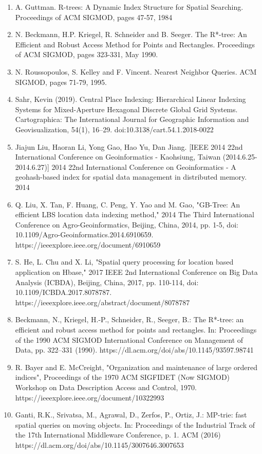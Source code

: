 %




\begin{enumerate}[1)]
    \item A. Guttman. R-trees: A Dynamic Index Structure for Spatial Searching. Proceedings of ACM SIGMOD, pages 47-57, 1984
    \item N. Beckmann, H.P. Kriegel, R. Schneider and B. Seeger. The R*-tree: An Efficient and Robust Access Method for Points and Rectangles. Proceedings of ACM SIGMOD, pages 323-331, May 1990.
    \item N. Roussopoulos, S. Kelley and F. Vincent. Nearest Neighbor Queries. ACM SIGMOD, pages 71-79, 1995.
    \item Sahr, Kevin (2019). Central Place Indexing: Hierarchical Linear Indexing Systems for Mixed-Aperture Hexagonal Discrete Global Grid Systems. Cartographica: The International Journal for Geographic Information and Geovisualization, 54(1), 16–29. doi:10.3138/cart.54.1.2018-0022
    \item  Jiajun Liu, Haoran Li, Yong Gao, Hao Yu, Dan Jiang. [IEEE 2014 22nd International Conference on Geoinformatics - Kaohsiung, Taiwan (2014.6.25-2014.6.27)] 2014 22nd International Conference on Geoinformatics - A geohash-based index for spatial data management in distributed memory. 2014
    \item Q. Liu, X. Tan, F. Huang, C. Peng, Y. Yao and M. Gao, "GB-Tree: An efficient LBS location data indexing method," 2014 The Third International Conference on Agro-Geoinformatics, Beijing, China, 2014, pp. 1-5, doi: 10.1109/Agro-Geoinformatics.2014.6910659. https://ieeexplore.ieee.org/document/6910659
    \item S. He, L. Chu and X. Li, "Spatial query processing for location based application on Hbase," 2017 IEEE 2nd International Conference on Big Data Analysis (ICBDA), Beijing, China, 2017, pp. 110-114, doi: 10.1109/ICBDA.2017.8078787. https://ieeexplore.ieee.org/abstract/document/8078787
    \item  Beckmann, N., Kriegel, H.-P., Schneider, R., Seeger, B.: The R*-tree: an efficient and robust access method for points and rectangles. In: Proceedings of the 1990 ACM SIGMOD International Conference on Management of Data, pp. 322–331 (1990). https://dl.acm.org/doi/abs/10.1145/93597.98741
    \item R. Bayer and E. McCreight, "Organization and maintenance of large ordered indices", Proceedings of the 1970 ACM SIGFIDET (Now SIGMOD) Workshop on Data Description Access and Control, 1970. https://ieeexplore.ieee.org/document/10322993
    \item Ganti, R.K., Srivatsa, M., Agrawal, D., Zerfos, P., Ortiz, J.: MP-trie: fast spatial queries on moving objects. In: Proceedings of the Industrial Track of the 17th International Middleware Conference, p. 1. ACM (2016) https://dl.acm.org/doi/abs/10.1145/3007646.3007653
\end{enumerate}

